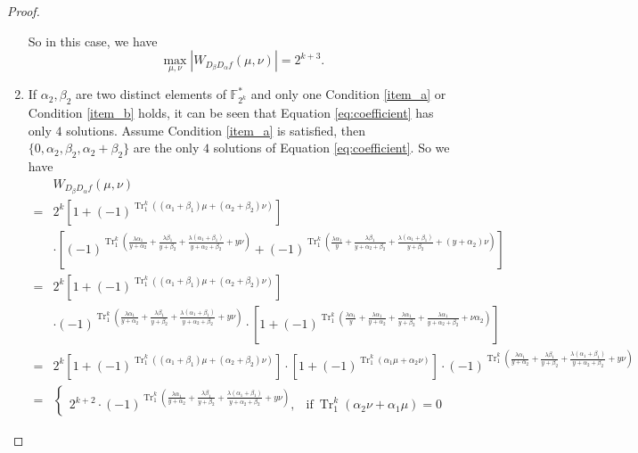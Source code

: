 \documentclass{article}
\newcommand{\F}{\mathbb{F}}
\newcommand{\0}{\textbf{0}}
\newcommand{\1}{\textbf{1}}
\newcommand{\TRACE}{\operatorname{Tr}_1^k}
\theoremstyle{plain}
\begin{document}
\begin{proof}
\begin{enumerate}[label=\textbf{Case \arabic*},wide = 0pt]
            So in this case, we have
            \[\max_{\mu,\nu}|W_{D_{\beta}D_{\alpha}f}(\mu,\nu)|=2^{k+3}.\]
            \item If $\alpha_2,\beta_2$ are two distinct elements of $\F_{2^k}^*$ and only one Condition \ref{item_a} or Condition \ref{item_b} holds,
            it can be seen that Equation \eqref{eq:coefficient} has only $4$ solutions.
            Assume Condition \ref{item_a} is satisfied, then $\{0,\alpha_2,\beta_2,\alpha_2+\beta_2\}$ are the only $4$ solutions of Equation \eqref{eq:coefficient}.
            So we have
            \begin{align}\label{eq:simpleforms_4}
                &W_{D_{\beta}D_{\alpha}f}(\mu,\nu)\nonumber\\
                =&2^k\left[1+(-1)^{\TRACE\left((\alpha_1+\beta_1)\mu+ (\alpha_2+\beta_2)\nu\right)}\right]\nonumber\\
                &\cdot
                \left[(-1)^{\TRACE\left(\frac{\lambda\alpha_1}{y+\alpha_2}+\frac{\lambda\beta_1}{y+\beta_2}+\frac{\lambda(\alpha_1+\beta_1)}{y+\alpha_2+\beta_2}+ y\nu\right)}+
                (-1)^{\TRACE\left(\frac{\lambda\alpha_1}{y}+\frac{\lambda\beta_1}{y+\alpha_2+\beta_2}+\frac{\lambda(\alpha_1+\beta_1)}{y+\beta_2}+ (y+\alpha_2)\nu\right)}\right]\nonumber\\
                =&2^k\left[1+(-1)^{\TRACE\left((\alpha_1+\beta_1)\mu+ (\alpha_2+\beta_2)\nu\right)}\right]\nonumber\\
                &\cdot
                (-1)^{\TRACE\left(\frac{\lambda\alpha_1}{y+\alpha_2}+\frac{\lambda\beta_1}{y+\beta_2}+\frac{\lambda(\alpha_1+\beta_1)}{y+\alpha_2+\beta_2}+ y\nu\right)}\cdot
                \left[1+(-1)^{\TRACE\left(\frac{\lambda\alpha_1}{y}+\frac{\lambda\alpha_1}{y+\alpha_2}+\frac{\lambda\alpha_1}{y+\beta_2}+\frac{\lambda\alpha_1}{y+\alpha_2+\beta_2}+\nu\alpha_2\right)}\right]\nonumber\\
                =&2^k\left[1+(-1)^{\TRACE\left((\alpha_1+\beta_1)\mu+ (\alpha_2+\beta_2)\nu\right)}\right]\cdot
                \left[1+(-1)^{\TRACE\left(\alpha_1\mu+\alpha_2\nu\right)}\right]\cdot
                (-1)^{\TRACE\left(\frac{\lambda\alpha_1}{y+\alpha_2}+\frac{\lambda\beta_1}{y+\beta_2}+\frac{\lambda(\alpha_1+\beta_1)}{y+\alpha_2+\beta_2}+ y\nu\right)}\nonumber\\
                =&\begin{cases}
                    2^{k+2}\cdot(-1)^{\TRACE\left(\frac{\lambda\alpha_1}{y+\alpha_2}+\frac{\lambda\beta_1}{y+\beta_2}+\frac{\lambda(\alpha_1+\beta_1)}{y+\alpha_2+\beta_2}+ y\nu\right)},&\text{if}~\TRACE\left(\alpha_2\nu+\alpha_1\mu\right)=0 ~

\end{cases}
\end{align}
\end{enumerate}
\end{proof}
\end{document}
